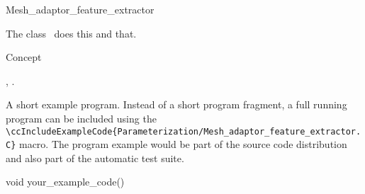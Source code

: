 

\begin{ccRefClass}{Mesh_adaptor_feature_extractor}  %


\ccDefinition
  
The class \ccRefName\ does this and that.


\ccIsModel

Concept

\ccTypes


\ccCreation
{}  %


\ccOperations


\ccSeeAlso

,
.

\ccExample

A short example program.
Instead of a short program fragment, a full running program can be
included using the 
\verb|\ccIncludeExampleCode{Parameterization/Mesh_adaptor_feature_extractor.C}| 
macro. The program example would be part of the source code distribution and
also part of the automatic test suite.

\begin{ccExampleCode}
void your_example_code() {
}
\end{ccExampleCode}


\end{ccRefClass}



